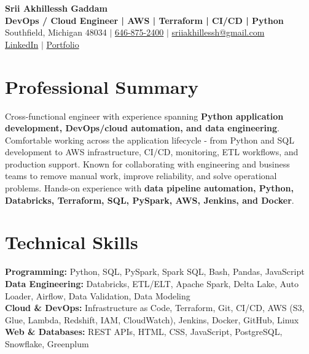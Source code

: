 \documentclass[letterpaper,10pt]{article}
\begin{document}
\fontsize{9.35pt}{10.45pt}\selectfont

\begin{center}
    {\LARGE \textbf{Srii Akhillessh Gaddam}} \\[-1pt]
    \textbf{DevOps / Cloud Engineer | AWS | Terraform | CI/CD | Python} \\[2pt]
    Southfield, Michigan 48034 $|$
    \href{tel:6468752400}{646-875-2400} $|$
    \href{mailto:sriiakhillessh@gmail.com}{sriiakhillessh@gmail.com} \\[1pt]
    \href{https://www.linkedin.com/in/srii-akhiilessh-gaddam-b48668191/}{LinkedIn} $|$
    \href{https://sriiakhillesshg.github.io/portfolio/}{Portfolio}
\end{center}
\vspace{-8pt}

\section{Professional Summary}
\small{Cross-functional engineer with experience spanning \textbf{Python application development, DevOps/cloud automation, and data engineering}. Comfortable working across the application lifecycle - from Python and SQL development to AWS infrastructure, CI/CD, monitoring, ETL workflows, and production support. Known for collaborating with engineering and business teams to remove manual work, improve reliability, and solve operational problems. Hands-on experience with \textbf{data pipeline automation, Python, Databricks, Terraform, SQL, PySpark, AWS, Jenkins, and Docker}.}

\section{Technical Skills}
\small{
\textbf{Programming:} Python, SQL, PySpark, Spark SQL, Bash, Pandas, JavaScript \\
\textbf{Data Engineering:} Databricks, ETL/ELT, Apache Spark, Delta Lake, Auto Loader, Airflow, Data Validation, Data Modeling \\
\textbf{Cloud \& DevOps:} Infrastructure as Code, Terraform, Git, CI/CD, AWS (S3, Glue, Lambda, Redshift, IAM, CloudWatch), Jenkins, Docker, GitHub, Linux \\
\textbf{Web \& Databases:} REST APIs, HTML, CSS, JavaScript, PostgreSQL, Snowflake, Greenplum
}
\end{document}
